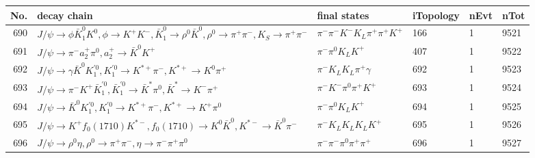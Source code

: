 \begin{table}[htbp] 
\begin{center}
\begin{small}
\begin{tabular}{rlllll}\hline\hline
 No. & decay chain & final states &  iTopology & nEvt & nTot \\\hline
690&$J/\psi       \rightarrow \phi           \bar{K}_1^{0} K^{0}          , \phi            \rightarrow K^{+}          K^{-}          , \bar{K}_1^{0}  \rightarrow \rho^{0}      \bar{K}^{0}   , \rho^{0}       \rightarrow \pi^{+}        \pi^{-}        , K_{S}           \rightarrow \pi^{+}        \pi^{-}        $&$\pi^{-}        \pi^{-}        K^{-}          K_{L}          \pi^{+}        \pi^{+}        K^{+}          $&  166&    1& 9521\\
691&$J/\psi       \rightarrow \pi^{-}        a_{2}^{+}      \pi^{0}        , a_{2}^{+}       \rightarrow \bar{K}^{0}   K^{+}          $&$\pi^{-}        \pi^{0}        K_{L}          K^{+}          $&  407&    1& 9522\\
692&$J/\psi       \rightarrow \gamma       \bar{K}^{0}   K_1^{'0}      , K_1^{'0}       \rightarrow K^{*+}         \pi^{-}        , K^{*+}          \rightarrow K^{0}          \pi^{+}        $&$\pi^{-}        K_{L}          K_{L}          \pi^{+}        \gamma       $&  692&    1& 9523\\
693&$J/\psi       \rightarrow \pi^{-}        K^{+}          \bar{K}_1^{'0}, \bar{K}_1^{'0} \rightarrow \bar{K}^{*}   \pi^{0}        , \bar{K}^{*}    \rightarrow K^{-}          \pi^{+}        $&$\pi^{-}        K^{-}          \pi^{0}        \pi^{+}        K^{+}          $&  693&    1& 9524\\
694&$J/\psi       \rightarrow \bar{K}^{0}   K_1^{'0}      , K_1^{'0}       \rightarrow K^{*+}         \pi^{-}        , K^{*+}          \rightarrow K^{+}          \pi^{0}        $&$\pi^{-}        \pi^{0}        K_{L}          K^{+}          $&  694&    1& 9525\\
695&$J/\psi       \rightarrow K^{+}          f_{0}(1710)    K^{*-}         , f_{0}(1710)     \rightarrow K^{0}          \bar{K}^{0}   , K^{*-}          \rightarrow \bar{K}^{0}   \pi^{-}        $&$\pi^{-}        K_{L}          K_{L}          K_{L}          K^{+}          $&  695&    1& 9526\\
696&$J/\psi       \rightarrow \rho^{0}      \eta          , \rho^{0}       \rightarrow \pi^{+}        \pi^{-}        , \eta           \rightarrow \pi^{-}        \pi^{+}        \pi^{0}        $&$\pi^{-}        \pi^{-}        \pi^{0}        \pi^{+}        \pi^{+}        $&  696&    1& 9527\\

\end{tabular}
\end{small}
\end{center}
\end{table}

